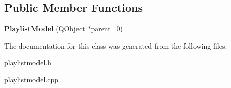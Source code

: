 \subsection*{Public Member Functions}
\begin{DoxyCompactItemize}
\item 
\hypertarget{class_playlist_model_a62aaf86821f96310da890e94ff083cb8}{{\bfseries Playlist\-Model} (Q\-Object $\ast$parent=0)}\label{class_playlist_model_a62aaf86821f96310da890e94ff083cb8}

\end{DoxyCompactItemize}


The documentation for this class was generated from the following files\-:\begin{DoxyCompactItemize}
\item 
playlistmodel.\-h\item 
playlistmodel.\-cpp\end{DoxyCompactItemize}
